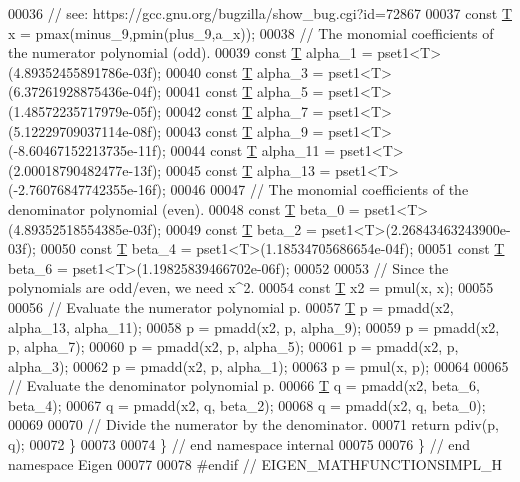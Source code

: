 \begin{DoxyCode}
00036   \textcolor{comment}{//      see: https://gcc.gnu.org/bugzilla/show\_bug.cgi?id=72867}
00037   \textcolor{keyword}{const} \hyperlink{group___sparse_core___module_class_eigen_1_1_triplet}{T} x = pmax(minus\_9,pmin(plus\_9,a\_x));
00038   \textcolor{comment}{// The monomial coefficients of the numerator polynomial (odd).}
00039   \textcolor{keyword}{const} \hyperlink{group___sparse_core___module_class_eigen_1_1_triplet}{T} alpha\_1 = pset1<T>(4.89352455891786e-03f);
00040   \textcolor{keyword}{const} \hyperlink{group___sparse_core___module_class_eigen_1_1_triplet}{T} alpha\_3 = pset1<T>(6.37261928875436e-04f);
00041   \textcolor{keyword}{const} \hyperlink{group___sparse_core___module_class_eigen_1_1_triplet}{T} alpha\_5 = pset1<T>(1.48572235717979e-05f);
00042   \textcolor{keyword}{const} \hyperlink{group___sparse_core___module_class_eigen_1_1_triplet}{T} alpha\_7 = pset1<T>(5.12229709037114e-08f);
00043   \textcolor{keyword}{const} \hyperlink{group___sparse_core___module_class_eigen_1_1_triplet}{T} alpha\_9 = pset1<T>(-8.60467152213735e-11f);
00044   \textcolor{keyword}{const} \hyperlink{group___sparse_core___module_class_eigen_1_1_triplet}{T} alpha\_11 = pset1<T>(2.00018790482477e-13f);
00045   \textcolor{keyword}{const} \hyperlink{group___sparse_core___module_class_eigen_1_1_triplet}{T} alpha\_13 = pset1<T>(-2.76076847742355e-16f);
00046 
00047   \textcolor{comment}{// The monomial coefficients of the denominator polynomial (even).}
00048   \textcolor{keyword}{const} \hyperlink{group___sparse_core___module_class_eigen_1_1_triplet}{T} beta\_0 = pset1<T>(4.89352518554385e-03f);
00049   \textcolor{keyword}{const} \hyperlink{group___sparse_core___module_class_eigen_1_1_triplet}{T} beta\_2 = pset1<T>(2.26843463243900e-03f);
00050   \textcolor{keyword}{const} \hyperlink{group___sparse_core___module_class_eigen_1_1_triplet}{T} beta\_4 = pset1<T>(1.18534705686654e-04f);
00051   \textcolor{keyword}{const} \hyperlink{group___sparse_core___module_class_eigen_1_1_triplet}{T} beta\_6 = pset1<T>(1.19825839466702e-06f);
00052 
00053   \textcolor{comment}{// Since the polynomials are odd/even, we need x^2.}
00054   \textcolor{keyword}{const} \hyperlink{group___sparse_core___module_class_eigen_1_1_triplet}{T} x2 = pmul(x, x);
00055 
00056   \textcolor{comment}{// Evaluate the numerator polynomial p.}
00057   \hyperlink{group___sparse_core___module_class_eigen_1_1_triplet}{T} p = pmadd(x2, alpha\_13, alpha\_11);
00058   p = pmadd(x2, p, alpha\_9);
00059   p = pmadd(x2, p, alpha\_7);
00060   p = pmadd(x2, p, alpha\_5);
00061   p = pmadd(x2, p, alpha\_3);
00062   p = pmadd(x2, p, alpha\_1);
00063   p = pmul(x, p);
00064 
00065   \textcolor{comment}{// Evaluate the denominator polynomial p.}
00066   \hyperlink{group___sparse_core___module_class_eigen_1_1_triplet}{T} q = pmadd(x2, beta\_6, beta\_4);
00067   q = pmadd(x2, q, beta\_2);
00068   q = pmadd(x2, q, beta\_0);
00069 
00070   \textcolor{comment}{// Divide the numerator by the denominator.}
00071   \textcolor{keywordflow}{return} pdiv(p, q);
00072 \}
00073 
00074 \} \textcolor{comment}{// end namespace internal}
00075 
00076 \} \textcolor{comment}{// end namespace Eigen}
00077 
00078 \textcolor{preprocessor}{#endif // EIGEN\_MATHFUNCTIONSIMPL\_H}
\end{DoxyCode}

